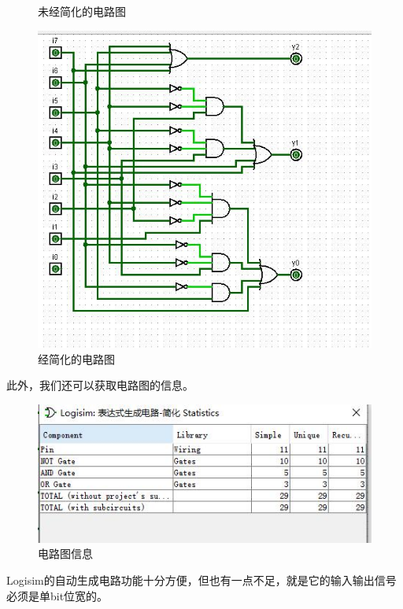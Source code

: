 \documentclass[UTF8]{article}
\begin{document}
\begin{figure}[H]
\begin{minipage}[H]{0.45\linewidth}
			\caption{未经简化的电路图}
			\label{CurcuitGenerateByExpression_Complex}
		\end{minipage}
		\begin{minipage}[H]{0.6\linewidth}
			\centering
			\includegraphics[scale=0.4]{CurcuitGenerateByExpression_Simple.jpg}
			\caption{经简化的电路图}
			\label{CurcuitGenerateByExpression_Simple}
		\end{minipage}
	\end{figure}
	此外，我们还可以获取电路图的信息。\par
	\begin{figure}[H]
		\centering
		\includegraphics[scale=0.7]{getInfor.jpg}
		\caption{电路图信息}
		\label{getInfor}
	\end{figure}
	Logisim的自动生成电路功能十分方便，但也有一点不足，就是它的输入输出信号必须是单bit位宽的。\par
\end{document}
